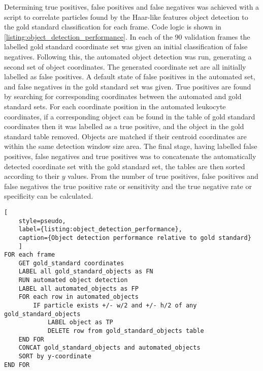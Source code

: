 Determining true positives, false positives and false negatives was achieved with a script to correlate particles found by the Haar-like features object detection to the gold standard classification for each frame. Code logic is shown in \autoref{listing:object_detection_performance}. In each of the 90 validation frames the labelled gold standard coordinate set was given an initial classification of false negatives. Following this, the automated object detection was run, generating a second set of object coordinates. The generated coordinate set are all initially labelled as false positives. A default state of false positives in the automated set, and false negatives in the gold standard set was given. True positives are found by searching for corresponding coordinates between the automated and gold standard sets. For each coordinate position in the automated leukocyte coordinates, if a corresponding object can be found in the table of gold standard coordinates then it was labelled as a true positive, and the object in the gold standard table removed. Objects are matched if their centroid coordinates are within the same detection window size area. The final stage, having labelled false positives, false negatives and true positives was to concatenate the automatically detected coordinate set with the gold standard set, the tables are then sorted according to their $y$ values. From the number of true positives, false positives and false negatives the true positive rate or sensitivity and the true negative rate or specificity can be calculated.

\begin{lstlisting}[
	style=pseudo,
	label={listing:object_detection_performance},
	caption={Object detection performance relative to gold standard}
	]
FOR each frame
	GET gold_standard coordinates
	LABEL all gold_standard_objects as FN
	RUN automated object detection
	LABEL all automated_objects as FP
	FOR each row in automated_objects
		IF particle exists +/- w/2 and +/- h/2 of any gold_standard_objects
			LABEL object as TP
			DELETE row from gold_standard_objects table
	END FOR
	CONCAT gold_standard_objects and automated_objects
	SORT by y-coordinate
END FOR
\end{lstlisting}

